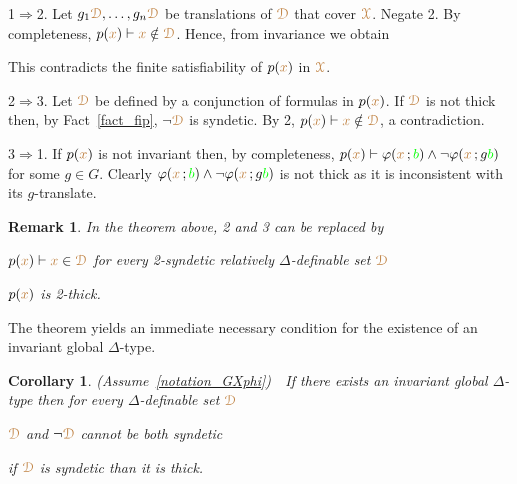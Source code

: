 \documentclass[10pt,openany]{amsproc}
\makeatletter
\newcommand{\mylabel}[1]{{\ssf{#1}}\hfill}
\renewenvironment{itemize}
  {\begin{list}{}{%
   \setlength{\parskip}{0mm}
   \setlength{\topsep}{.2\baselineskip}
   \setlength{\rightmargin}{0mm}
   \setlength{\listparindent}{0mm}
   \setlength{\itemindent}{0mm}
   \setlength{\labelwidth}{2ex}
   \setlength{\itemsep}{.1\baselineskip}
   \setlength{\parsep}{0mm}
   \setlength{\partopsep}{0mm}
   \setlength{\labelsep}{1ex}
   \setlength{\leftmargin}{\labelwidth+\labelsep}
   \let\makelabel\mylabel
   }}
   {\vspace*{-.3\baselineskip}\end{list}}
\def\proves{\vdash}
\def\IMP{\Rightarrow}
\def\D{\EuScript D}
\def\X{\EuScript X}
\def\theta{\vartheta}
\def\phi{\varphi}
\def\ssf#1{\textsf{\small #1}}
\newcounter{thm}
\theoremstyle{mio}
\newtheorem{corollary}[thm]{Corollary}\tcolorboxenvironment{corollary}{mythm}
\newtheorem{remark}[thm]{Remark}\tcolorboxenvironment{remark}{mythm}
\providecommand{\proofNameStyle}{\bfseries}
\renewenvironment{proof}[1][\proofname]{\par
  \pushQED{\qed}%
  \normalfont%
  \trivlist
  \item[\hskip\labelsep
        \proofNameStyle
    #1\@addpunct{.}]\ignorespaces
}{%
  \popQED\endtrivlist\@endpefalse
}
\def\mr{\color{brown}}
\def\gr{\color{green}}
\def\mrD{{\mr\D}}
\def\mrX{{\mr\X}}
\makeatother
\begin{document}
\begin{proof}
  \ssf1$\IMP$\ssf2.
  Let $g_1{\mr\D},\dots,g_n{\mr\D}$ be translations of $\mrD$ that cover $\mrX$.
  Negate \ssf2.
  By completeness, $p({\mr x})\proves {\mr x}\notin\mrD$.
  Hence, from invariance we obtain

  \ceq{\hfill p({\mr x})}{\proves}{{\mr x}\ \notin\ \bigcup_{i=1}^ng_i\mrD.}

  This contradicts the finite satisfiability of $p({\mr x})$ in $\mrX$.
  
  \ssf2$\IMP$\ssf3.
  Let $\mrD$ be defined by a conjunction of formulas in $p({\mr x})$.
  If $\mrD$ is not thick then, by Fact~\ref{fact_fip}, $\neg\mrD$ is syndetic. 
  By \ssf2, $p({\mr x})\proves{\mr x}\notin\mrD$, a contradiction.

  \ssf3$\IMP$\ssf1.
  If $p({\mr x})$ is not invariant then, by completeness, $p({\mr x})\proves\phi({\mr x}\,;{\gr b})\wedge\neg\phi({\mr x}\,;g{\gr b})$ for some $g\in G$.
  Clearly $\phi({\mr x}\,;{\gr b})\wedge\neg\phi({\mr x}\,;g{\gr b})$ is not thick as it is inconsistent with its $g$-translate.
\end{proof}

\begin{remark}
  In the theorem above, \ssf2 and \ssf3 can be replaced by
  \begin{itemize}
    \item[2$'$\!.] $p({\mr x})\proves{\mr x}\in\mrD$ for every 2-syndetic relatively $\Delta$-definable set $\mrD$
    \item[3$'$\!.] $p({\mr x})$ is 2-thick.
  \end{itemize}
\end{remark}

The theorem yields an immediate necessary condition for the existence of an invariant global $\Delta$-type.

\begin{corollary}
  (Assume~\ref{notation_GXphi})\ \  
  If there exists an invariant global $\Delta$-type then for every $\Delta$-definable set $\mrD$
  \begin{itemize}
    \item[1.] $\mrD$ and $\neg\mrD$ cannot be both syndetic
    \item[2.] if $\mrD$ is syndetic than it is thick.
  \end{itemize}
\end{corollary}
\end{document}
